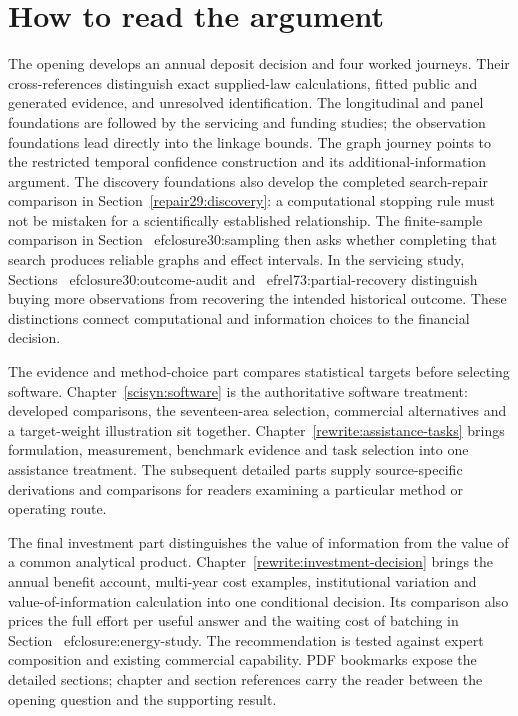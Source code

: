 \chapter*{How to read the argument}

The opening develops an annual deposit decision and four worked journeys.
Their cross-references distinguish exact supplied-law calculations, fitted
public and generated evidence, and unresolved identification. The longitudinal
and panel foundations are followed by the servicing and funding studies;
the observation foundations lead directly into the linkage bounds. The graph
journey points to the restricted temporal confidence construction and its
additional-information argument. The discovery foundations also develop the
completed search-repair comparison in Section~\ref{repair29:discovery}: a
computational stopping rule must not be mistaken for a scientifically
established relationship. The finite-sample comparison in
Section~
ef{closure30:sampling} then asks whether completing that search
produces reliable graphs and effect intervals. In the servicing study,
Sections~
ef{closure30:outcome-audit} and~
ef{rel73:partial-recovery}
distinguish buying more observations from recovering the intended historical
outcome. These distinctions connect computational and information choices
to the financial decision.

The evidence and method-choice part compares statistical targets before
selecting software. Chapter~\ref{scisyn:software} is the authoritative
software treatment: developed comparisons, the seventeen-area selection,
commercial alternatives and a target-weight illustration sit together.
Chapter~\ref{rewrite:assistance-tasks} brings formulation, measurement,
benchmark evidence and task selection into one assistance treatment.
The subsequent detailed parts supply source-specific derivations and
comparisons for readers examining a particular method or operating route.

The final investment part distinguishes the value of information from the
value of a common analytical product. Chapter~\ref{rewrite:investment-decision}
brings the annual benefit account, multi-year cost examples, institutional
variation and value-of-information calculation into one conditional decision.
Its comparison also prices the full effort per useful answer and the
waiting cost of batching in Section~
ef{closure:energy-study}. The
recommendation is tested against expert composition and existing
commercial capability. PDF bookmarks expose the detailed sections; chapter
and section references carry the reader between the opening question and
the supporting result.

